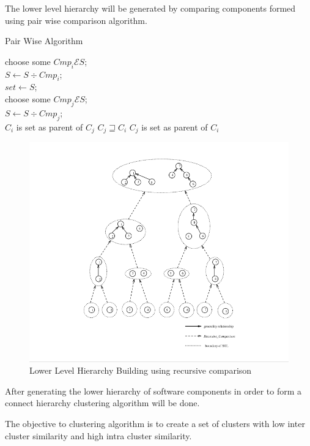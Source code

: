 \documentclass[12pt]{article}
\begin{document}
The lower level hierarchy will be generated by comparing components formed  using pair wise comparison algorithm.
\begin{algorithm}
	\caption{Pair Wise Algorithm}
	{
		choose some $Cmp_i \mathcal{E}  S $;\\
		$S \leftarrow S\div Cmp_i$;\\
		$set \leftarrow S$;\\
		{
			choose some $Cmp_j \mathcal{E}  S $;\\
			$S \leftarrow S\div Cmp_j$;\\
			{$C_i$ is set as parent of $C_j$ }
			\ElseIf
			{$C_j \sqsupseteq C_i$}
			{$C_j$ is set as parent of $C_i$}
		}
		
	}
\end{algorithm}
\begin{figure}
	\includegraphics[scale=0.6]{lowerLevelHierarchy.png}
	\caption{Lower Level Hierarchy Building using recursive comparison\cite{formal}}
	
\end{figure}

After generating the lower hierarchy of software components in order to form a connect hierarchy clustering algorithm will be done.

The objective to clustering algorithm is to create a set of clusters with low inter cluster similarity and high intra cluster similarity.
\end{document}
